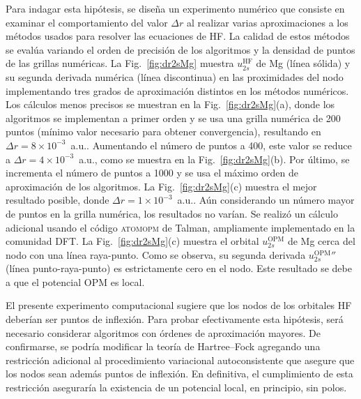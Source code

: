 Para indagar esta hipótesis, se diseña un experimento numérico que 
consiste en examinar el comportamiento del valor $\Delta r$ al realizar 
varias aproximaciones a los métodos usados para resolver las 
ecuaciones de HF. La calidad de estos métodos se evalúa variando el 
orden de precisión de los algoritmos y la densidad de puntos de las 
grillas numéricas. 
La Fig.~\ref{fig:dr2sMg} muestra $u_{2s}^{\mathrm{HF}}$ de Mg (línea 
sólida) y su segunda derivada numérica (línea discontinua) en las 
proximidades del nodo implementando tres grados de aproximación 
distintos en los métodos numéricos. Los cálculos menos precisos se 
muestran en la Fig.~\ref{fig:dr2sMg}(a), donde los algoritmos se 
implementan a primer orden y se usa una grilla numérica de 200 puntos 
(mínimo valor necesario para obtener convergencia), resultando en 
$\Delta r=8\times 10^{-3}$~a.u.. Aumentando el número de puntos a 400, 
este valor se reduce a $\Delta r=4\times 10^{-3}$~a.u., como se muestra 
en la Fig.~\ref{fig:dr2sMg}(b). Por último, se incrementa el número de 
puntos a 1000 y se usa el máximo orden de aproximación de los 
algoritmos. La Fig.~\ref{fig:dr2sMg}(c) muestra el mejor resultado 
posible, donde $\Delta r=1\times 10^{-3}$~a.u.. Aún considerando un 
número mayor de puntos en la grilla numérica, los resultados no varían. 
Se realizó un cálculo adicional usando el código \textsc{atomopm} de 
Talman, ampliamente implementado en la comunidad DFT. La 
Fig.~\ref{fig:dr2sMg}(c) muestra el orbital $u_{2s}^{\mathrm{OPM}}$ de 
Mg cerca del nodo con una línea raya-punto. Como se observa, su segunda 
derivada $u_{2s}^{\mathrm{OPM}}''$ (línea punto-raya-punto) es 
estrictamente cero en el nodo. Este resultado se debe a que el potencial
OPM es local. 

El presente experimento computacional sugiere que los nodos de los 
orbitales HF deberían ser puntos de inflexión. Para probar efectivamente 
esta hipótesis, será necesario considerar algoritmos con órdenes de 
aproximación mayores. De confirmarse, se podría modificar la teoría de 
Hartree--Fock agregando una restricción adicional al procedimiento 
variacional autoconsistente que asegure que los nodos sean además puntos 
de inflexión. En definitiva, el cumplimiento de esta restricción 
aseguraría la existencia de un potencial local, en principio, sin polos. 

